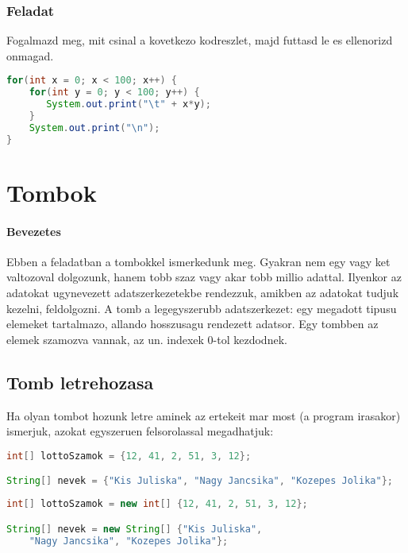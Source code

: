 \documentclass{article}
\begin{document}
\subsubsection{Feladat}

Fogalmazd meg, mit csinal a kovetkezo kodreszlet, majd futtasd le es ellenorizd onmagad.

\begin{lstlisting}[language=Java, caption=Feladat]
for(int x = 0; x < 100; x++) {
    for(int y = 0; y < 100; y++) {
       System.out.print("\t" + x*y);
    }
    System.out.print("\n");
}
\end{lstlisting}

\newpage

\section{Tombok}

\paragraph{Bevezetes}

Ebben a feladatban a tombokkel ismerkedunk meg. Gyakran nem egy vagy ket valtozoval dolgozunk, hanem tobb szaz vagy akar tobb millio adattal. Ilyenkor az adatokat ugynevezett adatszerkezetekbe rendezzuk, amikben az adatokat tudjuk kezelni, feldolgozni. A tomb a legegyszerubb adatszerkezet: egy megadott tipusu elemeket tartalmazo, allando hosszusagu rendezett adatsor. Egy tombben az elemek szamozva vannak, az un. indexek 0-tol kezdodnek.

\subsection{Tomb letrehozasa}

Ha olyan tombot hozunk letre aminek az ertekeit mar most (a program irasakor) ismerjuk, azokat egyszeruen felsorolassal megadhatjuk:

\begin{lstlisting}[language=Java, caption=Tomb letrehozas 1. modszere]
int[] lottoSzamok = {12, 41, 2, 51, 3, 12};

String[] nevek = {"Kis Juliska", "Nagy Jancsika", "Kozepes Jolika"};
\end{lstlisting}

\begin{lstlisting}[language=Java, caption=Tomb letrehozas 2. modszere]
int[] lottoSzamok = new int[] {12, 41, 2, 51, 3, 12};

String[] nevek = new String[] {"Kis Juliska",
    "Nagy Jancsika", "Kozepes Jolika"};
\end{lstlisting}
\end{document}
